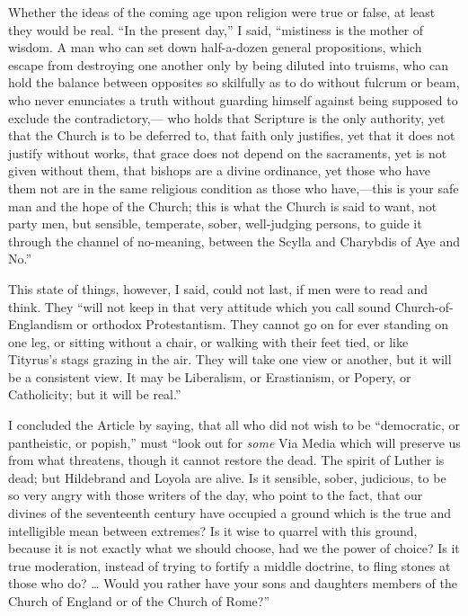 Whether the ideas of the coming age upon religion were true or false,
at least they would be real. ``In the present day,'' I
said, ``mistiness is the mother of wisdom. A man who can set down
half-a-dozen general propositions, which escape from destroying one
another only by being diluted into truisms, who can hold the balance
between opposites so skilfully as to do without fulcrum or beam, who
never enunciates a truth without guarding himself against being supposed
to exclude the contradictory,— who holds that Scripture is the only
authority, yet that the Church is to be deferred to, that faith only
justifies, yet that it does not justify without works, that grace does
not depend on the sacraments, yet is not given without them, that
bishops are a divine ordinance, yet those who have them not are in the
same religious condition as those who have,—this is your safe man and
the hope of the Church; this is what the Church is said to want, not
party men, but sensible, temperate, sober, well-judging persons, to
guide it through the channel of no-meaning, between the Scylla and
Charybdis of Aye and No.''

This state of things, however, I said, could not last, if men were to
read and think. They ``will not keep in that very
attitude which you call sound Church-of-Englandism or orthodox
Protestantism. They cannot go on for ever standing on one leg, or
sitting without a chair, or walking with their feet tied, or
like Tityrus's stags grazing in the air. They will take one view
or another, but it will be a consistent view. It may be Liberalism, or
Erastianism, or Popery, or Catholicity; but it will be real.''

I concluded the Article by saying, that all who did not wish to be
``democratic, or pantheistic, or popish,'' must ``look out
for \emph{some} Via Media which will preserve us from what threatens,
though it cannot restore the dead. The spirit of Luther is dead; but
Hildebrand and Loyola are alive. Is it sensible, sober, judicious, to be
so very angry with those writers of the day, who point to the fact, that
our divines of the seventeenth century have occupied a ground which is
the true and intelligible mean between extremes? Is it wise to quarrel
with this ground, because it is not exactly what we should choose, had
we the power of choice? Is it true moderation, instead of trying to
fortify a middle doctrine, to fling stones at those who do? … Would
you rather have your sons and daughters members of the Church of England
or of the Church of Rome?''

